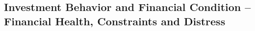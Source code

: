 \documentclass[12pt]{article}
\begin{document}
\subsection{Investment Behavior and Financial Condition -- Financial Health, Constraints and Distress}




\end{document}
